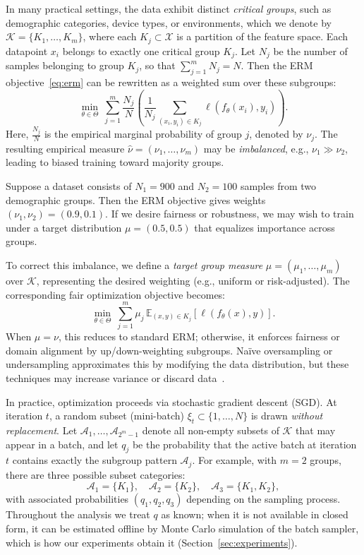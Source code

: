 \documentclass[9pt]{extarticle}
\theoremstyle{definition}
\renewcommand{\paragraph}[1]{\par\medskip\noindent{\bf #1}\hspace{0.5em}\ignorespaces}
\begin{document}
In many practical settings, the data exhibit distinct \emph{critical groups}, such as demographic categories, device types, or environments, which we denote by $\mathcal{K}=\{K_1,\ldots,K_m\}$, where each $K_j\subset\mathcal{X}$ is a partition of the feature space. Each datapoint $x_i$ belongs to exactly one critical group $K_j$.
Let $N_j$ be the number of samples belonging to group $K_j$, so that $\sum_{j=1}^m N_j = N$. Then the ERM objective~\eqref{eq:erm} can be rewritten as a weighted sum over these subgroups:
\begin{equation}\label{eq:erm-groups}
\boxed{\min_{\theta\in\Theta} \ \sum_{j=1}^{m}\frac{N_j}{N}\left(\frac{1}{N_j}\sum_{(x_i,y_i)\in K_j}\ell(f_\theta(x_i),y_i)\right)}.
\end{equation}
Here, $\frac{N_j}{N}$ is the empirical marginal probability of group $j$, denoted by $\nu_j$. The resulting empirical measure $\hat{\nu}=(\nu_1,\ldots,\nu_m)$ may be \emph{imbalanced}, e.g., $\nu_1\gg\nu_2$, leading to biased training toward majority groups.
\paragraph{Example.}
Suppose a dataset consists of $N_1=900$ and $N_2=100$ samples from two demographic groups. Then the ERM objective gives weights $(\nu_1,\nu_2)=(0.9,0.1)$. If we desire fairness or robustness, we may wish to train under a target distribution $\mu=(0.5,0.5)$ that equalizes importance across groups.

To correct this imbalance, we define a \emph{target group measure} $\mu=(\mu_1,\ldots,\mu_m)$ over $\mathcal{K}$, representing the desired weighting (e.g., uniform or risk-adjusted). The corresponding fair optimization objective becomes:
\begin{equation}\label{eq:fair-obj}
\boxed{\min_{\theta\in \Theta}\ \sum_{j=1}^{m}\mu_j\,\mathbb{E}_{(x,y)\in K_j}\left[\ell(f_\theta(x),y)\right]}.
\end{equation}
When $\mu=\nu$, this reduces to standard ERM; otherwise, it enforces fairness or domain alignment by up/down-weighting subgroups. Naïve oversampling or undersampling approximates this by modifying the data distribution, but these techniques may increase variance or discard data~\cite{buda2018systematic, he2009learning}.

In practice, optimization proceeds via stochastic gradient descent (SGD). At iteration $t$, a random subset (mini-batch) $\xi_t\subset\{1,\ldots,N\}$ is drawn \emph{without replacement}. Let $\mathcal{A}_1,\ldots,\mathcal{A}_{2^m-1}$ denote all non-empty subsets of $\mathcal{K}$ that may appear in a batch, and let $q_j$ be the probability that the active batch at iteration $t$ contains exactly the subgroup pattern $\mathcal{A}_j$.
For example, with $m=2$ groups, there are three possible subset categories:
\[
\mathcal{A}_1=\{K_1\},\quad \mathcal{A}_2=\{K_2\},\quad \mathcal{A}_3=\{K_1,K_2\},
\]
with associated probabilities $(q_1,q_2,q_3)$ depending on the sampling process. Throughout the analysis we treat $q$ as known; when it is not available in closed form, it can be estimated offline by Monte Carlo simulation of the batch sampler, which is how our experiments obtain it (Section~\ref{sec:experiments}).
\end{document}
